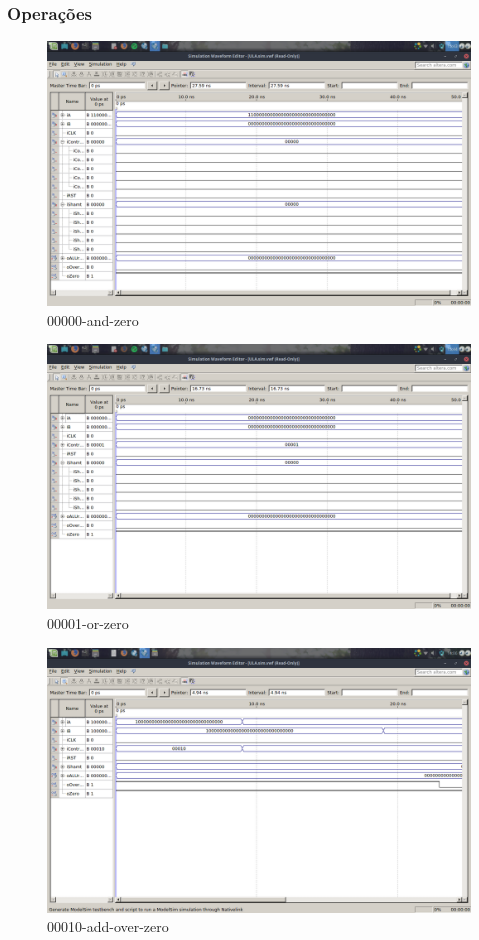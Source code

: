 \documentclass[12pt]{article}
\begin{document}
\subsubsection{Operações}
\label{subsubsec:2op}

\begin{figure}[H]
	\centering
	\includegraphics[width=.8\textwidth]{00000-and-zero.png}
	\caption{00000-and-zero}
	\label{fig:00000-and-zero}
\end{figure}

\begin{figure}[H]
	\centering
	\includegraphics[width=.8\textwidth]{00001-or-zero.png}
	\caption{00001-or-zero}
	\label{fig:00001-or-zero}
\end{figure}

\begin{figure}[H]
	\centering
	\includegraphics[width=.8\textwidth]{00010-add-over-zero.png}
	\caption{00010-add-over-zero}
	\label{fig:00010-add-over-zero}
\end{figure}
\end{document}
